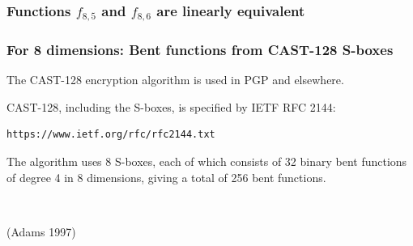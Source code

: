 \documentclass[pdf,sprung,slideColor,nocolorBG]{beamer}
\newenvironment{colortheme}[1]{
\def\ProvidesPackageRCS $##1${\relax}
\renewcommand{\ProcessOptions}{\relax}
\makeatletter

\makeatother
}{}
\newcommand{\slidecite}[1]{\tiny{(#1)}\normalsize{}}
\begin{document}
\begin{colortheme}{jubata}
\begin{frame}
\frametitle{Functions $f_{8,5}$ and $f_{8,6}$ are linearly equivalent}
\end{frame}

\end{colortheme}

\begin{colortheme}{seagull}

\begin{frame}[fragile]
\frametitle{For 8 dimensions: Bent functions from CAST-128 S-boxes}

The CAST-128 encryption algorithm is used in PGP and elsewhere.

CAST-128, including the S-boxes, is specified by IETF RFC 2144:
\begin{verbatim}
https://www.ietf.org/rfc/rfc2144.txt
\end{verbatim}

The algorithm uses 8 S-boxes,
each of which consists of 32 binary bent functions of degree 4 in 8 dimensions,
giving a total of 256 bent functions.

~

\slidecite{Adams 1997}
\end{frame}

\end{colortheme}
\end{document}
